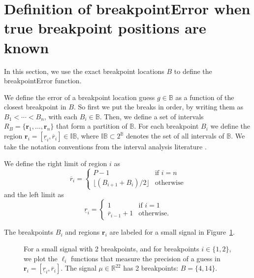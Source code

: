 \documentclass{jsfds} %
\renewcommand{\r}{ \mathbf{ r} }
\newcommand{\rileft}[1][i]{\underline r_{#1}}
\newcommand{\riright}[1][i]{\overline r_{#1}}
\newcommand{\RR}{\mathbb{R}}
\begin{document}
\newpage

\section{Definition of breakpointError when true breakpoint positions
  are known}
\label{sec:breakpoint_error}

In this section, we use the exact breakpoint locations $B$ to define the
breakpointError function.

We define the error of a breakpoint location guess $g\in\mathbb
B$ as a function of the closest breakpoint in $B$. So
first we put the breaks in order, by writing them as $B_1<\cdots<
B_n$, with each $B_i\in\mathbb B$. Then, we define a set of intervals
$R_B=\{\r_1,\dots,\r_n\}$ that form a partition of $\mathbb B$. For each
breakpoint $B_i$ we define the region
${\r}_i=[\rileft,\riright]\in\mathbb I \mathbb B$, where $\mathbb
I\mathbb B\subset 2^{\mathbb B}$ denotes the set of all intervals of
$\mathbb B$. We take the notation conventions from the interval
analysis literature \citep{intervals}.

We define the right limit of region $i$ as
\begin{equation}
  \label{eq:R_i}
\riright
=
  \begin{cases}
    P-1 & \text{if } i=n \\
    \lfloor (B_{i+1}+B_i)/2 \rfloor & \text{otherwise}
  \end{cases}
\end{equation}
and
the left limit as
\begin{equation}
  \label{eq:L_i}
  \rileft =
  \begin{cases}
    1 & \text{if } i=1 \\
    \riright[i-1]+1 & \text{otherwise}.
  \end{cases}
\end{equation}

The breakpoints $B_i$ and regions $\r_i$ are labeled for a small
signal in Figure~\ref{fig:exact_imprecision}.

\begin{figure}[H]
  \centering
  
  \vskip -0.5cm
  \caption{For a small signal with 2 breakpoints, and for breakpoints
    $i\in\{1, 2\}$, we plot the $\ell_i$ functions that measure the
    precision of a guess in $\mathbf r_i = [\underline r_i, \overline
    r_i]$.  The signal $\mu\in\RR^{22}$ has 2 breakpoints:
    $B=\{4,14\}$.}
  \label{fig:exact_imprecision}
\end{figure}
\end{document}
